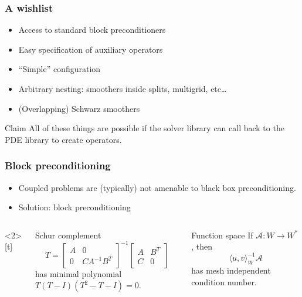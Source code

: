 \documentclass[presentation,aspectratio=43]{beamer}
\begin{document}
\begin{frame}
  \frametitle{A wishlist}
  \begin{itemize}
  \item Access to standard block preconditioners
  \item Easy specification of auxiliary operators
  \item ``Simple'' configuration
  \item Arbitrary nesting: smoothers inside splits, multigrid, etc\ldots
  \item (Overlapping) Schwarz smoothers
  \end{itemize}

  \begin{block}{Claim}
    All of these things are possible if the solver library can call
    back to the PDE library to create operators.
  \end{block}
\end{frame}


\begin{frame}
  \frametitle{Block preconditioning}
  \begin{itemize}
  \item Coupled problems are (typically) not amenable to black
    box preconditioning.
  \item<2-> Solution: block preconditioning
  \end{itemize}
  \begin{columns}<2>[t]
    \begin{column}{0.5\textwidth}
      \begin{block}{Schur complement}
        \begin{equation*}
          T = \begin{bmatrix}
            A & 0 \\
            0 & C A^{-1} B^T
          \end{bmatrix}^{-1}
          \begin{bmatrix}
            A & B^T \\
            C & 0
          \end{bmatrix}
        \end{equation*}
        has minimal polynomial $T(T - I)(T^2 - T - I) = 0$.
        \nocite{Murphy:2000,Ipsen:2001,Benzi:2005}
      \end{block}
    \end{column}
    \begin{column}{0.5\textwidth}
      \begin{block}{Function space}
        If $\mathcal{A} : W \rightarrow W^*$, then
        \begin{equation*}
          \langle u, v \rangle_W^{-1} \mathcal{A}
        \end{equation*}
        has mesh independent condition number.
        \nocite{Malek:2014,Mardal:2011,Kirby:2010}
      \end{block}
    \end{column}
  \end{columns}
\end{frame}
\end{document}
